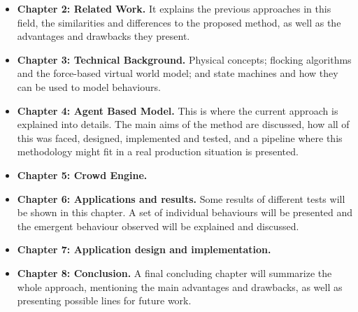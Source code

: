 \begin{itemize}

\item {{\bf Chapter 2: Related Work.} It explains the previous approaches in this field, the similarities and differences to the proposed method, as well as the advantages and drawbacks they present.}

\item {{\bf Chapter 3: Technical Background.} Physical concepts; flocking algorithms and the force-based virtual world model; and state machines and how they can be used to model behaviours.}

\item {{\bf Chapter 4: Agent Based Model.} This is where the current approach is explained into details. The main aims of the method are discussed, how all of this was faced, designed, implemented and tested, and a pipeline where this methodology might fit in a real production situation is presented.}

\item{{\bf Chapter 5: Crowd Engine.}}

\item {{\bf Chapter 6: Applications and results.} Some results of different tests will be shown in this chapter. A set of individual behaviours will be presented and the emergent behaviour observed will be explained and discussed.}

\item{{\bf Chapter 7: Application design and implementation.}}

\item {{\bf Chapter 8: Conclusion.} A final concluding chapter will summarize the whole approach, mentioning the main advantages and drawbacks, as well as presenting possible lines for future work.}

\end{itemize}

\ifx\isEmbedded\undefined


\pagebreak

\fi


